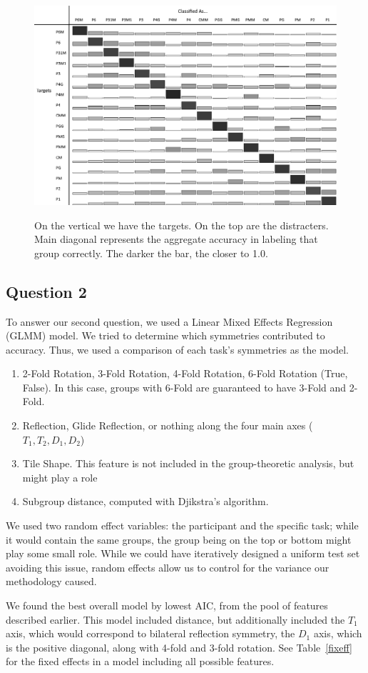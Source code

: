 \begin{figure}[!ht]
\centering
\includegraphics[width=0.9\columnwidth]{accuracies-grayscale}
\label{fullacc}
\caption{On the vertical we have the targets. On the top are the distracters. Main diagonal represents the aggregate accuracy in labeling that group correctly. The darker the bar, the closer to 1.0.}
\end{figure}

\subsection{Question 2}
To answer our second question, we used a Linear Mixed Effects Regression (GLMM) model. We tried to determine which symmetries contributed to accuracy. Thus, we used a comparison of each task's symmetries as the model.
\begin{enumerate}
\item 2-Fold Rotation, 3-Fold Rotation, 4-Fold Rotation, 6-Fold Rotation (True, False). In this case, groups with 6-Fold are guaranteed to have 3-Fold and 2-Fold.
\item Reflection, Glide Reflection, or nothing along the four main axes ($T_1, T_2, D_1, D_2$)
\item Tile Shape. This feature is not included in the group-theoretic analysis, but might play a role
\item Subgroup distance, computed with Djikstra's algorithm. 
\end{enumerate}

We used two random effect variables: the participant and the specific task; while it would contain the same groups, the group being on the top or bottom might play some small role. While we could have iteratively designed a uniform test set avoiding this issue, random effects allow us to control for the variance our methodology caused.


We found the best overall model by lowest AIC, from the pool of features described earlier. This model included distance, but additionally included the $T_1$ axis, which would correspond to bilateral reflection symmetry, the $D_1$ axis, which is the positive diagonal, along with 4-fold and 3-fold rotation. See Table~\ref{fixeff} for the fixed effects in a model including all possible features.